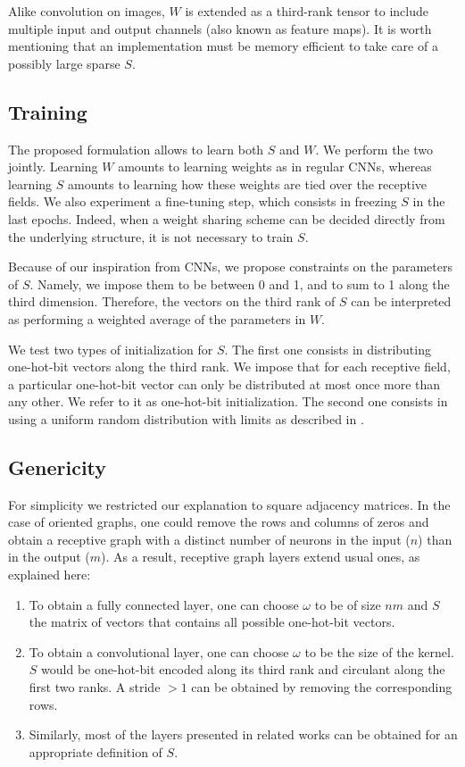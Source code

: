 Alike convolution on images, $W$ is extended as a third-rank tensor to include multiple input and output channels (also known as feature maps). It is worth mentioning that an implementation must be memory efficient to take care of a possibly large sparse $S$.

\subsection{Training}

The proposed formulation allows to learn both $S$ and $W$. We perform the two jointly. Learning $W$ amounts to learning weights as in regular CNNs, whereas learning $S$ amounts to learning how these weights are tied over the receptive fields. We also experiment a fine-tuning step, which consists in freezing $S$ in the last epochs. Indeed, when a weight sharing scheme can be decided directly from the underlying structure, it is not necessary to train $S$.

Because of our inspiration from CNNs, we propose constraints on the parameters of $S$. Namely, we impose them to be between 0 and 1, and to sum to 1 along the third dimension. Therefore, the vectors on the third rank of $S$ can be interpreted as performing a weighted average of the parameters in $W$.

We test two types of initialization for $S$. The first one consists in distributing one-hot-bit vectors along the third rank. We impose that for each receptive field, a particular one-hot-bit vector can only be distributed at most once more than any other. We refer to it as one-hot-bit initialization. The second one consists in using a uniform random distribution with limits as described in \cite{glorot2010understanding}.

\subsection{Genericity}

For simplicity we restricted our explanation to square adjacency matrices. In the case of oriented graphs, one could remove the rows and columns of zeros and obtain a receptive graph with a distinct number of neurons in the input ($n$) than in the output ($m$). As a result, receptive graph layers extend usual ones, as explained here:
\begin{enumerate}
\item To obtain a fully connected layer, one can choose $\omega$ to be of size $nm$ and $S$ the matrix of vectors that contains all possible one-hot-bit vectors.
\item To obtain a convolutional layer, one can choose $\omega$ to be the size of the kernel. $S$ would be one-hot-bit encoded along its third rank and circulant along the first two ranks. A stride $> 1$ can be obtained by removing the corresponding rows.
\item Similarly, most of the layers presented in related works can be obtained for an appropriate definition of $S$.
\end{enumerate}

